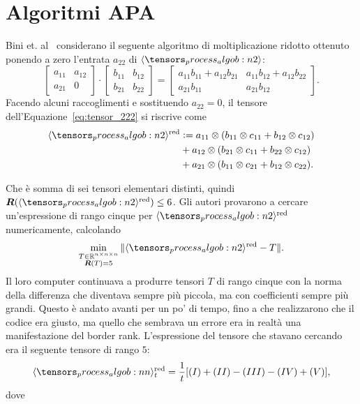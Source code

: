 \section{Algoritmi APA}
\label{sec:APA}

Bini et. al~\cite{bini1980relations} considerano il seguente algoritmo di moltiplicazione ridotto ottenuto ponendo a zero l'entrata $ a_{22} $ di $ \algob{2} $:
\begin{equation*}
	\begin{bmatrix}
		a_{11} & a_{12} \\
		a_{21} & 0
	\end{bmatrix} \cdot
	\begin{bmatrix}
		b_{11} & b_{12} \\
		b_{21} & b_{22}
	\end{bmatrix} =
	\begin{bmatrix}
		a_{11}b_{11} + a_{12}b_{21} & a_{11}b_{12} + a_{12}b_{22} \\
		a_{21}b_{11}                & a_{21}b_{12}
	\end{bmatrix}.
\end{equation*}
Facendo alcuni raccoglimenti e sostituendo $ a_{22} =0$, il tensore dell'Equazione~\eqref{eq:tensor_222} si riscrive come
\begin{equation*}
	\begin{aligned}
		\algob{2}^{\text{red}}
		 & \defeq a_{11} \otimes (b_{11} \otimes c_{11} + b_{12} \otimes c_{12}) \\
		 & + a_{12} \otimes (b_{21} \otimes c_{11} + b_{22} \otimes c_{12})      \\
		 & + a_{21} \otimes (b_{11} \otimes c_{21} + b_{12}
		\otimes c_{22}).
	\end{aligned}
\end{equation*}

Che è somma di sei tensori elementari distinti, quindi $ \rk(\algob{2}^{\text{red}}) \le 6 $.
Gli autori provarono a cercare un'espressione di rango cinque per $ \algob{2}^{\text{red}} $
numericamente, calcolando
\begin{equation*}
	\min_{\substack{T \in \R^{n\times n\times n} \\ \rk(T) = 5}}{\| \algob{2}^{\text{red}} - T\| }.
\end{equation*}
Il loro computer continuava a produrre tensori $ T $ di rango cinque
con la norma della differenza che diventava sempre più piccola, ma con coefficienti sempre più
grandi. Questo è andato avanti per un po' di tempo, fino a che realizzarono che il codice era
giusto, ma quello che sembrava un errore era in realtà una manifestazione del border rank.
L'espressione del tensore che stavano cercando era il seguente tensore di rango $ 5 $:
\begin{equation*}
	\begin{aligned}
		\algob{n}_t^{\text{red}} = \frac{1}{t} \left[ (I) + (II) -(III) - (IV) + (V)
			\right],
	\end{aligned}
\end{equation*}
dove

